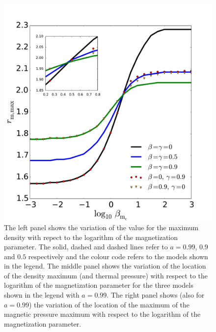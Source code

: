 \documentclass{aa}
\begin{document}
\begin{figure}
\hspace{-0.2cm}
\includegraphics[scale=0.16]{figures/fig6c.pdf}
\caption{The left panel shows the variation of the value for the maximum density with repect to the logarithm of the magnetization parameter. The solid, dashed and dashed lines refer to $a = 0.99$, $0.9$ and $0.5$ respectively and the colour code refers to the models shown in the legend. The middle panel shows the variation of the location of the density maximum (and thermal pressure) with respect to the logarithm of the magnetization parameter for the three models shown in the legend with $a = 0.99$. The right panel shows (also for $a = 0.99$) the variation of the location of the maximum of the magnetic pressure maximum with respect to the logarithm of the magnetization parameter.}
           \label{max-vs-magnetization}%
 \end{figure}
 
\end{document}
